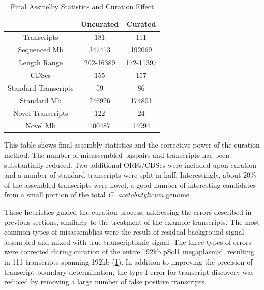 \begin{table}
\begin{center}
\begin{tabular}{|c|c|c|}\hline
  & Uncurated & Curated\\\hline\hline
Transcripts & 181 & 111\\\hline
Sequenced Mb & 347413 & 192069\\\hline
Length Range & 202-16389 & 172-11397\\\hline
CDSes & 155 & 157\\\hline
Standard Transcripts & 59 & 86\\\hline
Standard Mb & 246926 & 174801\\\hline
Novel Transcripts & 122 & 24\\\hline
Novel Mb & 100487 & 14994\\\hline
\end{tabular}
\end{center}
\caption{Final Assmelby Statistics and Curation Effect}\label{table:assemb_curation}
This table shows final assembly statistics and the corrective power of the curation method. The number of misassembled baspairs and transcripts has been substantially reduced. Two additional ORFs/CDSes were included upon curation and a number of standard transcripts were split in half. Interestingly, about 20\% of the assembled transcripts were novel, a good number of interesting candidates from a small portion of the total \textit{C. acetobutylicum} genome.
\end{table}



These heuristics guided the curation process, addressing the errors described in previous sections, similarly to the treatment of the example transcripts. The most common types of misassemblies were the result of residual background signal assembled and mixed with true transcriptomic signal. The three types of errors were corrected during curation of the entire 192kb pSol1 megaplasmid, resulting in 111 transcripts spanning 192kb (\ref{table:assemb_curation}). In addition to improving the precision of transcript boundary determination, the type I error for transcript discovery was reduced by removing a large number of false positive transcripts.

